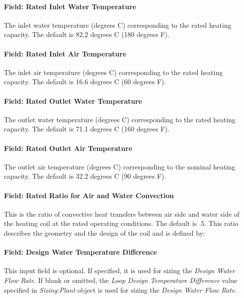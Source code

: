 \paragraph{Field: Rated Inlet Water Temperature}\label{field-rated-inlet-water-temperature}

The inlet water temperature (degrees C) corresponding to the rated heating capacity. The default is 82.2 degrees C (180 degrees F).

\paragraph{Field: Rated Inlet Air Temperature}\label{field-rated-inlet-air-temperature}

The inlet air temperature (degrees C) corresponding to the rated heating capacity. The default is 16.6 degrees C (60 degrees F).

\paragraph{Field: Rated Outlet Water Temperature}\label{field-rated-outlet-water-temperature}

The outlet water temperature (degrees C) corresponding to the rated heating capacity. The default is 71.1 degrees C (160 degrees F).

\paragraph{Field: Rated Outlet Air Temperature}\label{field-rated-outlet-air-temperature}

The outlet air temperature (degrees C) corresponding to the nominal heating capacity. The default is 32.2 degrees C (90 degrees F).

\paragraph{Field: Rated Ratio for Air and Water Convection}\label{field-rated-ratio-for-air-and-water-convection}

This is the ratio of convective heat transfers between air side and water side of the heating coil at the rated operating conditions. The default is .5. This ratio describes the geometry and the design of the coil and is defined by:

\paragraph{Field: Design Water Temperature Difference}\label{field-design-water-temperature-difference}
This input field is optional. If specified, it is used for sizing the \textit{Design Water Flow Rate}. If blank or omitted, the \textit{Loop Design Temperature Difference} value specified in \textit{Sizing:Plant} object is used for sizing the \textit{Design Water Flow Rate}.

